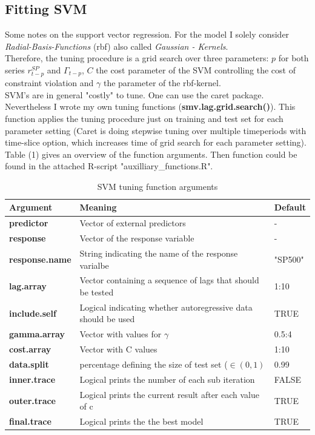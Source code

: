 \documentclass[fleqn]{article}
\begin{document}
\subsection*{Fitting SVM}

Some notes on the support vector regression. For the model I solely consider \textit{Radial-Basis-Functions} (rbf) also called \textit{Gaussian - Kernels}. \\
Therefore, the tuning procedure is a grid search over three parameters: $p$ for both series $r_{t-p}^{SP}$ and $\Gamma_{t-p}$, $C$ the cost parameter of the SVM controlling the cost of constraint violation and $\gamma$ the parameter of the rbf-kernel.\\
SVM's are in general "costly" to tune. One can use the caret package. Nevertheless I wrote my own tuning functions (\textbf{smv.lag.grid.search()}). This function applies the tuning procedure just on training and test set for each parameter setting (Caret is doing stepwise tuning over multiple timeperiods with time-slice option, which increases time of grid search for each parameter setting). \\ 
Table (1) gives an overview of the function arguments. Then function could be found in the attached R-script "auxilliary\_functions.R".

\begin{table}[!h]
	\centering
	\vspace{0.3cm}
	\begin{tabular}{l|l|l}
		\toprule \toprule
		\textbf{Argument} & \textbf{Meaning} & Default \\ 
		\hline
		\textbf{predictor}& Vector of external predictors & - \\
		\textbf{response}& Vector of the response variable & - \\
		\textbf{response.name}& String indicating the name of the response varialbe & "SP500"  \\
		\textbf{lag.array}& Vector containing a sequence of lags that should be tested &  1:10 \\
		\textbf{include.self}& Logical indicating whether autoregressive data should be used & TRUE \\
		\textbf{gamma.array }& Vector with values for $\gamma$ &0.5:4 \\
		\textbf{cost.array }& Vector with C values & 1:10  \\
		\textbf{data.split}& percentage defining the size of test set ($\in \left(0,1\right)$ & 0.99\\
		\textbf{inner.trace}& Logical prints the number of each sub iteration& FALSE\\
		\textbf{outer.trace}& Logical prints the current result after each value of c & TRUE \\
		\textbf{final.trace}& Logical prints the the best model & TRUE\\
		\bottomrule
	\end{tabular}\\
	\caption{SVM tuning function arguments}
\end{table}
\end{document}
